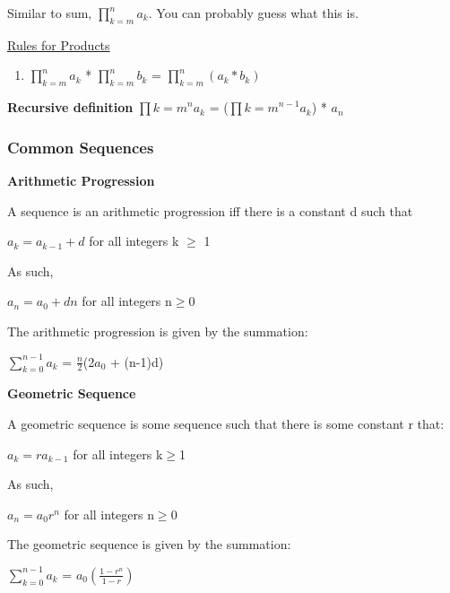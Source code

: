 \documentclass{article}
\newcommand{\sub}[1]{\vspace{10pt}\textbf{#1}}
\begin{document}
Similar to sum, $\prod_{k=m}^{n} a_k$. You can probably guess what this is.

\underline{Rules for Products}
\begin{enumerate}
    \item $\prod_{k=m}^{n} a_k$ * $\prod_{k=m}^{n} b_k$ = $\prod_{k=m}^{n} (a_k * b_k)$
\end{enumerate}

\sub{Recursive definition}
$\prod{k=m}^{n} a_k$ = ($\prod{k=m}^{n-1} a_k$) * $a_n$

\subsubsection{Common Sequences}
\sub{Arithmetic Progression}

A sequence is an arithmetic progression iff there is a constant d such that
\begin{center}
    $a_k = a_{k-1} + d$ for all integers k $\geq$ 1
\end{center}

As such,

\begin{center}
    $a_n = a_0 + dn$ for all integers n$\geq$0
\end{center}

The arithmetic progression is given by the summation:
\begin{center}
    $\sum_{k=0}^{n-1} a_k$ = $\frac{n}{2}$(2$a_0$ + (n-1)d)
\end{center}

\sub{Geometric Sequence}

A geometric sequence is some sequence such that there is some constant r that:
\begin{center}
    $a_k = ra_{k-1}$ for all integers k$\geq$1
\end{center}

As such,

\begin{center}
    $a_n = a_0r^n$ for all integers n$\geq$0
\end{center}

The geometric sequence is given by the summation:
\begin{center}
    $\sum_{k=0}^{n-1} a_k$ = $a_0(\frac{1-r^n}{1-r})$
\end{center}
\end{document}
